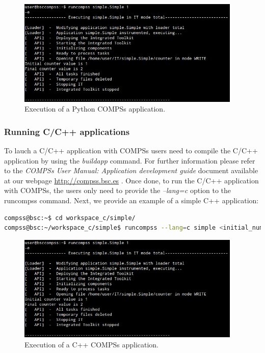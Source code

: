 \begin{figure}[h!]
  \centering
    \includegraphics[width=0.95\textwidth]{./Sections/2_Execution/Figures/python_execution.jpeg}
    \caption{Execution of a Python COMPSs application. \label{fig:python_execution}}
\end{figure}
\vspace{-0.4cm}


\subsubsection{Running C/C++ applications}
To lauch a C/C++ application with COMPSs users need to compile the C/C++ application by using the \textit{buildapp} command. For 
further information please refer to the \textit{COMPSs User Manual: Application development guide} document available at our
webpage \url{http://compss.bsc.es} . Once done, to run the C/C++ application with COMPSs, the users only need to provide 
the \textit{--lang=c} option to the runcompss command. Next, we provide an example of a simple C++ application:

\begin{lstlisting}[language=bash]
compss@bsc:~$ cd workspace_c/simple/
compss@bsc:~/workspace_c/simple$ runcompss --lang=c simple <initial_number>
\end{lstlisting}

\begin{figure}[h!]
  \centering
    \includegraphics[width=0.95\textwidth]{./Sections/2_Execution/Figures/c_execution.jpeg}
    \caption{Execution of a C++ COMPSs application. \label{fig:c_execution}}
\end{figure}
\vspace{-0.4cm}


